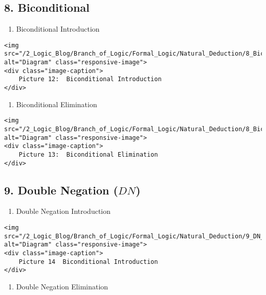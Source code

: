 \subsection{8. Biconditional}\label{biconditional}

\begin{enumerate}
\def\labelenumi{\alph{enumi}.}
\tightlist
\item
  Biconditional Introduction
\end{enumerate}

\begin{verbatim}
<img src="/2_Logic_Blog/Branch_of_Logic/Formal_Logic/Natural_Deduction/8_Bicon_Intro.png" alt="Diagram" class="responsive-image">
<div class="image-caption">
    Picture 12:  Biconditional Introduction
</div>
\end{verbatim}

\begin{enumerate}
\def\labelenumi{\alph{enumi}.}
\setcounter{enumi}{1}
\tightlist
\item
  Biconditional Elimination
\end{enumerate}

\begin{verbatim}
<img src="/2_Logic_Blog/Branch_of_Logic/Formal_Logic/Natural_Deduction/8_Bicon_elim.png" alt="Diagram" class="responsive-image">
<div class="image-caption">
    Picture 13:  Biconditional Elimination
</div>
\end{verbatim}

\subsection{\texorpdfstring{9. Double Negation
(\(DN\))}{9. Double Negation (DN)}}\label{double-negation-dn}

\begin{enumerate}
\def\labelenumi{\alph{enumi}.}
\tightlist
\item
  Double Negation Introduction
\end{enumerate}

\begin{verbatim}
<img src="/2_Logic_Blog/Branch_of_Logic/Formal_Logic/Natural_Deduction/9_DN_Intro.png" alt="Diagram" class="responsive-image">
<div class="image-caption">
    Picture 14  Biconditional Introduction
</div>
\end{verbatim}

\begin{enumerate}
\def\labelenumi{\alph{enumi}.}
\setcounter{enumi}{1}
\tightlist
\item
  Double Negation Elimination
\end{enumerate}

